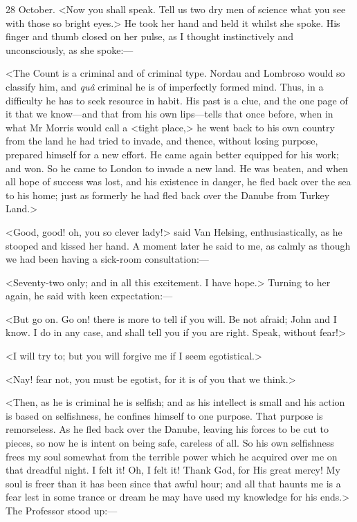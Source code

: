 \begin{diary}{28 October.}
<Now you shall speak. Tell us two dry men of science what you see with those so bright eyes.> He took her hand and held it whilst she spoke. His finger and thumb closed on her pulse, as I thought instinctively and unconsciously, as she spoke:—

<The Count is a criminal and of criminal type. Nordau and Lombroso would so classify him, and \textit{quâ} criminal he is of imperfectly formed mind. Thus, in a difficulty he has to seek resource in habit. His past is a clue, and the one page of it that we know—and that from his own lips—tells that once before, when in what Mr Morris would call a <tight place,> he went back to his own country from the land he had tried to invade, and thence, without losing purpose, prepared himself for a new effort. He came again better equipped for his work; and won. So he came to London to invade a new land. He was beaten, and when all hope of success was lost, and his existence in danger, he fled back over the sea to his home; just as formerly he had fled back over the Danube from Turkey Land.>

<Good, good! oh, you so clever lady!> said Van Helsing, enthusiastically, as he stooped and kissed her hand. A moment later he said to me, as calmly as though we had been having a sick-room consultation:—

<Seventy-two only; and in all this excitement. I have hope.> Turning to her again, he said with keen expectation:—

<But go on. Go on! there is more to tell if you will. Be not afraid; John and I know. I do in any case, and shall tell you if you are right. Speak, without fear!>

<I will try to; but you will forgive me if I seem egotistical.>

<Nay! fear not, you must be egotist, for it is of you that we think.>

<Then, as he is criminal he is selfish; and as his intellect is small and his action is based on selfishness, he confines himself to one purpose. That purpose is remorseless. As he fled back over the Danube, leaving his forces to be cut to pieces, so now he is intent on being safe, careless of all. So his own selfishness frees my soul somewhat from the terrible power which he acquired over me on that dreadful night. I felt it! Oh, I felt it! Thank God, for His great mercy! My soul is freer than it has been since that awful hour; and all that haunts me is a fear lest in some trance or dream he may have used my knowledge for his ends.> The Professor stood up:—


\end{diary}

